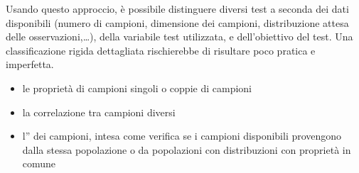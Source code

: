 \documentclass[letterpaper,10pt,italian]{jupyterBook}
\begin{document}
\sphinxAtStartPar
Usando questo approccio, è possibile distinguere diversi test a seconda dei dati disponibili (numero di campioni, dimensione dei campioni, distribuzione attesa delle osservazioni,…), della variabile test utilizzata, e dell’obiettivo del test. Una classificazione rigida dettagliata rischierebbe di risultare poco pratica e imperfetta.

\sphinxAtStartPar
{}
\begin{itemize}
\item {} 
\sphinxAtStartPar
le proprietà di campioni singoli o coppie di campioni

\item {} 
\sphinxAtStartPar
la correlazione tra campioni diversi

\item {} 
\sphinxAtStartPar
l” dei campioni, intesa come verifica se i campioni disponibili provengono dalla stessa popolazione o da popolazioni con distribuzioni con proprietà in comune

\end{itemize}
\end{document}
